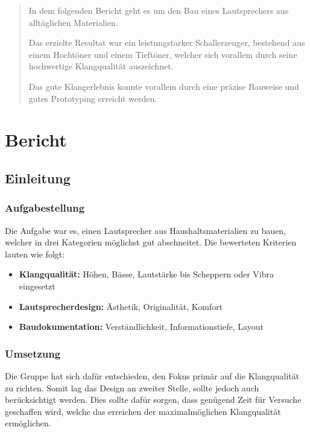 \documentclass[a4paper,11pt]{report}
\begin{document}
\begin{abstract}
    In dem folgenden Bericht geht es um den Bau eines Lautsprechers aus alltäglichen Materialien.

    Das erzielte Resultat war ein leistungstarker Schallerzeuger, bestehend aus einem Hochtöner und einem Tieftöner, welcher sich vorallem durch seine hochwertige Klangqualität auszeichnet.

    Das gute Klangerlebnis konnte vorallem durch eine präzise Bauweise und gutes Prototyping erreicht werden.
\end{abstract}

\tableofcontents
\thispagestyle{empty}

\setcounter{page}{1}

\part{Bericht}

\chapter{Einleitung}
\section{Aufgabestellung}
Die Aufgabe war es, einen Lautsprecher aus Haushaltsmaterialien zu bauen, welcher in drei Kategorien möglichst gut abschneitet. Die bewerteten Kriterien lauten wie folgt:
\begin{itemize}
    \item \textbf{Klangqualität:} Höhen, Bässe, Lautstärke bis Scheppern oder Vibra eingesetzt
    \item \textbf{Lautsprecherdesign:} Ästhetik, Originalität, Komfort
    \item \textbf{Baudokumentation:} Verständlichkeit, Informationstiefe, Layout 
\end{itemize}
\section{Umsetzung}
Die Gruppe hat sich dafür entschieden, den Fokus primär auf die Klangqualität zu richten. Somit lag das Design an zweiter Stelle, sollte jedoch auch berücksichtigt werden. Dies sollte dafür sorgen, dass genügend Zeit für Versuche geschaffen wird, welche das erreichen der maximalmöglichen Klangqualität ermöglichen.
\end{document}
